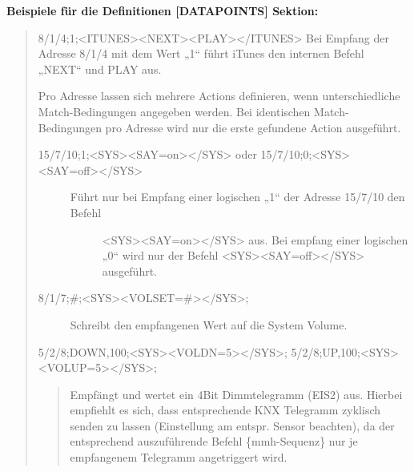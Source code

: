 \documentclass[letterpaper,10pt,english]{sphinxmanual}
\begin{document}
\textbf{Beispiele für die Definitionen {[}DATAPOINTS{]} Sektion:}
\begin{quote}

8/1/4;1;\textless{}ITUNES\textgreater{}\textless{}NEXT\textgreater{}\textless{}PLAY\textgreater{}\textless{}/ITUNES\textgreater{}
Bei Empfang der Adresse 8/1/4 mit dem Wert „1“ führt iTunes den internen Befehl „NEXT“ und PLAY aus.

Pro Adresse lassen sich mehrere Actions definieren, wenn unterschiedliche Match-Bedingungen angegeben werden. Bei identischen Match-Bedingungen pro Adresse wird nur die erste gefundene Action ausgeführt.
\begin{description}
\item[{15/7/10;1;\textless{}SYS\textgreater{}\textless{}SAY=on\textgreater{}\textless{}/SYS\textgreater{} oder 15/7/10;0;\textless{}SYS\textgreater{}\textless{}SAY=off\textgreater{}\textless{}/SYS\textgreater{}}] \leavevmode\begin{description}
\item[{Führt nur bei Empfang einer logischen „1“ der Adresse 15/7/10 den Befehl}] \leavevmode
\textless{}SYS\textgreater{}\textless{}SAY=on\textgreater{}\textless{}/SYS\textgreater{} aus. Bei empfang einer logischen „0“ wird nur der Befehl
\textless{}SYS\textgreater{}\textless{}SAY=off\textgreater{}\textless{}/SYS\textgreater{} ausgeführt.

\end{description}

\item[{8/1/7;\#;\textless{}SYS\textgreater{}\textless{}VOLSET=\#\textgreater{}\textless{}/SYS\textgreater{};}] \leavevmode
Schreibt den empfangenen Wert auf die System Volume.

\end{description}

5/2/8;DOWN,100;\textless{}SYS\textgreater{}\textless{}VOLDN=5\textgreater{}\textless{}/SYS\textgreater{};
5/2/8;UP,100;\textless{}SYS\textgreater{}\textless{}VOLUP=5\textgreater{}\textless{}/SYS\textgreater{};
\begin{quote}

Empfängt und wertet ein 4Bit Dimmtelegramm (EIS2) aus.
Hierbei empfiehlt es sich, dass entsprechende KNX Telegramm zyklisch senden zu lassen
(Einstellung am entspr. Sensor beachten), da der entsprechend auszuführende Befehl \{mmh-Sequenz\} nur je empfangenem  Telegramm angetriggert wird.
\end{quote}
\end{quote}
\end{document}
